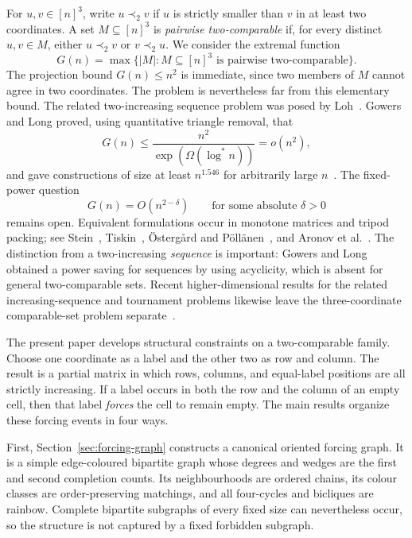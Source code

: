 \documentclass[11pt]{article}
\numberwithin{equation}{section}
\theoremstyle{definition}
\theoremstyle{remark}
\begin{document}
For $u,v\in[n]^3$, write $u\prec_2 v$ if $u$ is strictly smaller than $v$
in at least two coordinates.  A set $M\subseteq[n]^3$ is \emph{pairwise
two-comparable} if, for every distinct $u,v\in M$, either $u\prec_2v$ or
$v\prec_2u$.  We consider the extremal function
\[
 G(n)=\max\{|M|:M\subseteq[n]^3\text{ is pairwise two-comparable}\}.
\]
The projection bound $G(n)\le n^2$ is immediate, since two members of $M$
cannot agree in two coordinates.  The problem is nevertheless far from this
elementary bound.  The related two-increasing sequence problem was posed by
Loh~\cite{Loh}.  Gowers and Long proved, using quantitative triangle removal,
that
\[
 G(n)\le \frac{n^2}{\exp(\Omega(\log^*n))}=o(n^2),
\]
and gave constructions of size at least $n^{1.546}$ for arbitrarily large
$n$~\cite{GowersLong,Fox}.  The fixed-power question
\begin{equation}\label{eq:open-problem}
 G(n)=O(n^{2-\delta})\qquad\text{for some absolute }\delta>0
\end{equation}
remains open.  Equivalent formulations occur in monotone matrices and tripod
packing; see Stein~\cite{Stein}, Tiskin~\cite{Tiskin}, Östergård and
Pöllänen~\cite{OstergardPollanen}, and Aronov et al.~\cite{AronovEtAl}.
The distinction from a two-increasing \emph{sequence} is important: Gowers and
Long obtained a power saving for sequences by using acyclicity, which is absent
for general two-comparable sets.  Recent higher-dimensional results for the
related increasing-sequence and tournament problems likewise leave the
three-coordinate comparable-set problem separate~\cite{FoxSudakovWigderson}.

The present paper develops structural constraints on a two-comparable family.
Choose one coordinate as a label and the other two as row and column.  The
result is a partial matrix in which rows, columns, and equal-label positions
are all strictly increasing.  If a label occurs in both the row and the column
of an empty cell, then that label \emph{forces} the cell to remain empty.  The
main results organize these forcing events in four ways.

First, Section~\ref{sec:forcing-graph} constructs a canonical oriented forcing
graph.  It is a simple edge-coloured bipartite graph whose degrees and wedges
are the first and second completion counts.  Its neighbourhoods are ordered
chains, its colour classes are order-preserving matchings, and all four-cycles
and bicliques are rainbow.  Complete bipartite subgraphs of every fixed size
can nevertheless occur, so the structure is not captured by a fixed forbidden
subgraph.
\end{document}
